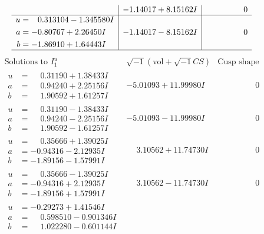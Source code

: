 \documentclass[1p]{elsarticle_modified}
\theoremstyle{definition}
\newcommand{\I}{\sqrt{-1}}
\begin{document}
$$\begin{array}{c|c|c}
 & -1.14017 + 8.15162 I & \phantom{-0.000000 } 0 \\ \hline\begin{aligned}
u &= \phantom{-}0.313104 - 1.345580 I \\
a &= -0.80767 + 2.26450 I \\
b &= -1.86910 + 1.64443 I\end{aligned}
 & -1.14017 - 8.15162 I & \phantom{-0.000000 } 0\\
 \hline 
 \end{array}$$\newpage$$\begin{array}{c|c|c}  
\text{Solutions to }I^u_{1}& \I (\text{vol} + \sqrt{-1}CS) & \text{Cusp shape}\\
 \hline 
\begin{aligned}
u &= \phantom{-}0.31190 + 1.38433 I \\
a &= \phantom{-}0.94240 + 2.25156 I \\
b &= \phantom{-}1.90592 + 1.61257 I\end{aligned}
 & -5.01093 + 11.99980 I & \phantom{-0.000000 } 0 \\ \hline\begin{aligned}
u &= \phantom{-}0.31190 - 1.38433 I \\
a &= \phantom{-}0.94240 - 2.25156 I \\
b &= \phantom{-}1.90592 - 1.61257 I\end{aligned}
 & -5.01093 - 11.99980 I & \phantom{-0.000000 } 0 \\ \hline\begin{aligned}
u &= \phantom{-}0.35666 + 1.39025 I \\
a &= -0.94316 - 2.12935 I \\
b &= -1.89156 - 1.57991 I\end{aligned}
 & \phantom{-}3.10562 + 11.74730 I & \phantom{-0.000000 } 0 \\ \hline\begin{aligned}
u &= \phantom{-}0.35666 - 1.39025 I \\
a &= -0.94316 + 2.12935 I \\
b &= -1.89156 + 1.57991 I\end{aligned}
 & \phantom{-}3.10562 - 11.74730 I & \phantom{-0.000000 } 0 \\ \hline\begin{aligned}
u &= -0.29273 + 1.41546 I \\
a &= \phantom{-}0.598510 - 0.901346 I \\
b &= \phantom{-}1.022280 - 0.601144 I\end{aligned}

\end{array}$$
\end{document}
